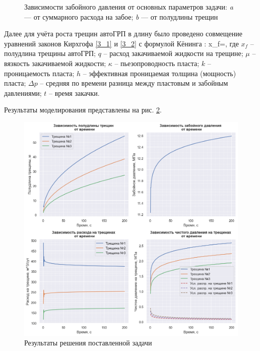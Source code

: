 \begin{figure}[H]
\begin{subfigure}[t]{\dimexpr.5\linewidth-1.3em\relax}
	\end{subfigure}
\captionsetup{justification=centering} %
\caption{Зависимости забойного давления от основных параметров задачи: {\itshape a} --- от суммарного расхода на забое; {\itshape b} --- от полудлины трещин} 
\label{fig:results1}
\end{figure}

Далее для учёта роста трещин автоГРП в длину было проведено совмещение уравнений законов Кирхгофа \eqref{3_1} и \eqref{3_2} с формулой Кёнинга \cite{koning}:
\beq
x_f=,
\eeq
где $x_f$ -- полудлина трещины автоГРП;\newline
$q$ -- расход закачиваемой жидкости на трещине;\newline
$\mu$ -- вязкость закачиваемой жидкости;\newline
$\kappa$ -- пьезопроводность пласта;\newline
$k$ -- проницаемость пласта;\newline
$h$ -- эффективная проницаемая толщина (мощность) пласта;\newline
$\Delta p$ -- средняя по времени разница между пластовым и забойным давлениями;\newline
$t$ -- время закачки.

Результаты моделирования представлены на рис. \ref{fig:results2}.
 
\begin{figure}[H] 
\center
\includegraphics[width=\linewidth]{images/Kirchhoff+Koning.png}
\caption{Результаты решения поставленной задачи} 
\label{fig:results2}  
\end{figure}

